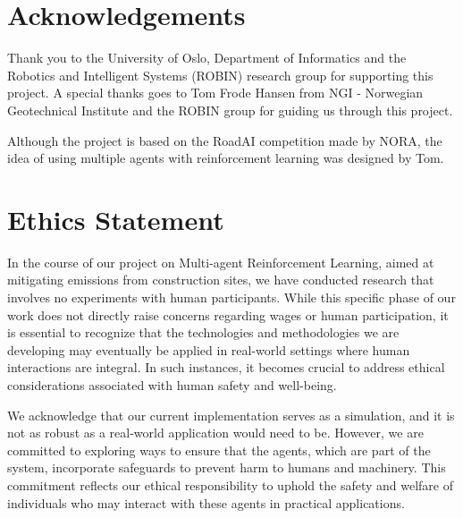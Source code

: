 \documentclass[conference]{IEEEtran}
\begin{document}


	\section{Acknowledgements}
	Thank you to the University of Oslo, Department of Informatics and the Robotics and
	Intelligent Systems (ROBIN) research group for supporting this project. A special thanks goes to
	Tom Frode Hansen from NGI - Norwegian Geotechnical Institute and the ROBIN group for guiding us through
	this project.

	Although the project is based on the RoadAI competition made by NORA, the idea of using multiple
	agents with reinforcement learning was designed by Tom.




	\section{Ethics Statement}
	In the course of our project on Multi-agent Reinforcement Learning, aimed at mitigating \coo{} emissions
	from construction sites, we have conducted research that involves no experiments with human participants.
	While this specific phase of our work does not directly raise concerns regarding wages or human
	participation, it is essential to recognize that the technologies and methodologies we are developing
	may eventually be applied in real-world settings where human interactions are integral. In such instances,
	it becomes crucial to address ethical considerations associated with human safety and well-being.

	We acknowledge that our current implementation serves as a simulation, and it is not as robust as a
	real-world application would need to be. However, we are committed to exploring ways to ensure that the
	agents, which are part of the system, incorporate safeguards to prevent harm to humans and machinery.
	This commitment reflects our ethical responsibility to uphold the safety and welfare of individuals who
	may interact with these agents in practical applications.
\end{document}
